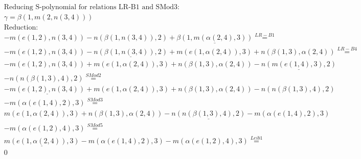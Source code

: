 \documentclass[11pt]{amsart}
\begin{document}
\begin{align*} 
& \text{Reducing S-polynomial for relations LR-B1 and SMod3:} \\ 
& \gamma = \beta(1,m(2,n(3,4))) \\ 
& \text{Reduction}: \\& - m(e(1,2),n(3,4)) - n(\beta(1,n(3,4)),2) + \underline{\beta(1,m(\alpha(2,4),3))} \stackrel{ LR-B1 }{=}  \\ 
& - m(e(1,2),n(3,4)) - \underline{n(\beta(1,n(3,4)),2)} + m(e(1,\alpha(2,4)),3) + n(\beta(1,3),\alpha(2,4)) \stackrel{ LR-B4 }{=}  \\ 
& - m(e(1,2),n(3,4)) + m(e(1,\alpha(2,4)),3) + n(\beta(1,3),\alpha(2,4)) - \underline{n(m(e(1,4),3),2)}\\ 
 &  - n(n(\beta(1,3),4),2) \stackrel{ SMod2 }{=}  \\ 
& - \underline{m(e(1,2),n(3,4))} + m(e(1,\alpha(2,4)),3) + n(\beta(1,3),\alpha(2,4)) - n(n(\beta(1,3),4),2)\\ 
 &  - m(\alpha(e(1,4),2),3) \stackrel{ SMod3 }{=}  \\ 
&m(e(1,\alpha(2,4)),3) + n(\beta(1,3),\alpha(2,4)) - \underline{n(n(\beta(1,3),4),2)} - m(\alpha(e(1,4),2),3)\\ 
 &  - m(\alpha(e(1,2),4),3) \stackrel{ SMod5 }{=}  \\ 
&\underline{m(e(1,\alpha(2,4)),3)} - m(\alpha(e(1,4),2),3) - m(\alpha(e(1,2),4),3) \stackrel{ Leib1 }{=}  \\ 
&0\\ 
\end{align*} 
 
\end{document}
